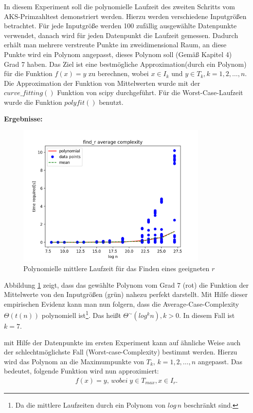 \documentclass[12pt,oneside]{article}
\theoremstyle{remark}
\theoremstyle{definition}
\begin{document}
In diesem Experiment soll die polynomielle Laufzeit des zweiten Schritts vom AKS-Primzahltest demonstriert werden. Hierzu werden verschiedene Inputgrößen betrachtet. Für jede Inputgröße werden 100 zufällig ausgewählte Datenpunkte verwendet, danach wird für jeden Datenpunkt die Laufzeit gemessen. Dadurch erhält man mehrere verstreute Punkte im zweidimensional Raum, an diese Punkte wird ein Polynom angepasst, dieses Polynom soll (Gemäß Kapitel 4) Grad 7 haben. Das Ziel ist eine bestmögliche Approximation(durch ein Polynom) für die Funktion $f(x) = y$ zu berechnen, wobei $x \in I_{k}$ und $y \in T_{k}, k = 1,2, \dots, n$. Die Approximation der Funktion von Mittelwerten wurde mit der \href{https://docs.scipy.org/doc/scipy/reference/generated/scipy.optimize.curve_fit.html}{$curve\_fitting()$} Funktion von scipy durchgeführt. Für die Worst-Case-Laufzeit wurde die Funktion \href{https://numpy.org/doc/stable/reference/generated/numpy.polyfit.html}{$polyfit()$} benutzt.


\textbf{\small{Ergebnisse:}}
\begin{figure}[h]
\includegraphics[width=9.5cm]{plots/runtime_find_r.png}
\centering
\caption{Polynomielle mittlere Laufzeit für das Finden eines geeigneten $r$}
\label{runtime-find_r}
\end{figure}

Abbildung \ref{runtime-find_r} zeigt, dass das gewählte Polynom vom Grad 7 (rot) die Funktion der Mittelwerte von den Inputgrößen (grün) nahezu perfekt darstellt. Mit Hilfe dieser empirischen Evidenz kann man nun folgern, dass die Average-Case-Complexity $\Theta(t(n))$ polynomiell ist\footnote{Da die mittlere Laufzeiten durch ein Polynom von $log \, n$ beschränkt sind.}. Das heißt $\Theta^{\sim}(log^k  n), k > 0$. In diesem Fall ist $k = 7$.\newline


mit Hilfe der Datenpunkte im ersten Experiment kann auf ähnliche Weise auch der schlechtmöglichste Fall (Worst-case-Complexity) bestimmt werden. Hierzu wird das Polynom an die Maximumpunkte von $T_{k}, \, k = 1,2, \dots, n$ angepasst. Das bedeutet, folgende Funktion wird nun approximiert: 
\begin{align*}
    f(x) = y, \, wobei \; y \in T_{max} , x \in I_{r}.
\end{align*}
\end{document}
